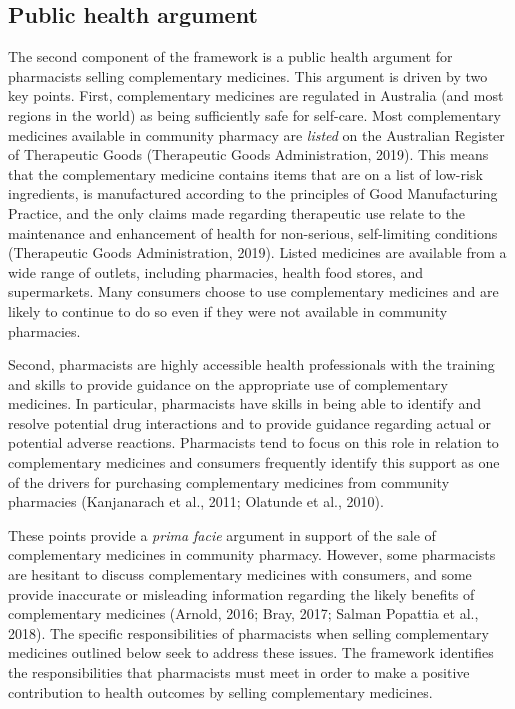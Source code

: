 \documentclass[12pt,]{article}
\begin{document}
\subsection{Public health argument}\label{public-health-argument}

The second component of the framework is a public health argument for
pharmacists selling complementary medicines. This argument is driven by
two key points. First, complementary medicines are regulated in
Australia (and most regions in the world) as being sufficiently safe for
self-care. Most complementary medicines available in community pharmacy
are \emph{listed} on the Australian Register of Therapeutic Goods
(Therapeutic Goods Administration, 2019). This means that the
complementary medicine contains items that are on a list of low-risk
ingredients, is manufactured according to the principles of Good
Manufacturing Practice, and the only claims made regarding therapeutic
use relate to the maintenance and enhancement of health for non-serious,
self-limiting conditions (Therapeutic Goods Administration, 2019).
Listed medicines are available from a wide range of outlets, including
pharmacies, health food stores, and supermarkets. Many consumers choose
to use complementary medicines and are likely to continue to do so even
if they were not available in community pharmacies.

Second, pharmacists are highly accessible health professionals with the
training and skills to provide guidance on the appropriate use of
complementary medicines. In particular, pharmacists have skills in being
able to identify and resolve potential drug interactions and to provide
guidance regarding actual or potential adverse reactions. Pharmacists
tend to focus on this role in relation to complementary medicines and
consumers frequently identify this support as one of the drivers for
purchasing complementary medicines from community pharmacies
(Kanjanarach et al., 2011; Olatunde et al., 2010).

These points provide a \emph{prima facie} argument in support of the
sale of complementary medicines in community pharmacy. However, some
pharmacists are hesitant to discuss complementary medicines with
consumers, and some provide inaccurate or misleading information
regarding the likely benefits of complementary medicines (Arnold, 2016;
Bray, 2017; Salman Popattia et al., 2018). The specific responsibilities
of pharmacists when selling complementary medicines outlined below seek
to address these issues. The framework identifies the responsibilities
that pharmacists must meet in order to make a positive contribution to
health outcomes by selling complementary medicines.
\end{document}
